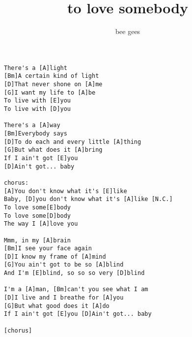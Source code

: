 \author{bee gees}
\title{to love somebody}
\maketitle
\begin{verbatim}
There's a [A]light
[Bm]A certain kind of light
[D]That never shone on [A]me
[G]I want my life to [A]be
To live with [E]you
To live with [D]you

There's a [A]way
[Bm]Everybody says
[D]To do each and every little [A]thing
[G]But what does it [A]bring
If I ain't got [E]you
[D]Ain't got... baby

chorus:
[A]You don't know what it's [E]like
Baby, [D]you don't know what it's [A]like [N.C.]
To love some[E]body
To love some[D]body
The way I [A]love you

Mmm, in my [A]brain
[Bm]I see your face again
[D]I know my frame of [A]mind
[G]You ain't got to be so [A]blind
And I'm [E]blind, so so so very [D]blind

I'm a [A]man, [Bm]can't you see what I am
[D]I live and I breathe for [A]you
[G]But what good does it [A]do
If I ain't got [E]you [D]Ain't got... baby

[chorus]
\end{verbatim}